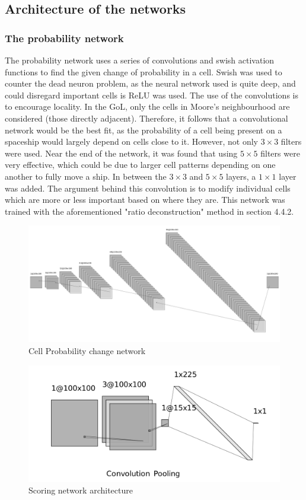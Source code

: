 \documentclass{l4proj}
\begin{document}
\subsection{Architecture of the networks}

\subsubsection{The probability network}

The probability network uses a series of convolutions and swish activation functions to find the given change of probability in a cell. Swish was used to counter the dead neuron problem, as the neural network used is quite deep, and could disregard important cells is ReLU was used. The use of the convolutions is to encourage locality. In the GoL, only the cells in Moore's neighbourhood are considered (those directly adjacent). Therefore, it follows that a convolutional network would be the best fit, as the probability of a cell being present on a spaceship would largely depend on cells close to it. However, not only $3 \times 3$ filters were used. Near the end of the network, it was found that using $5 \times 5$ filters were very effective, which could be due to larger cell patterns depending on one another to fully move a ship. In between the $3 \times 3$ and $5 \times 5$ layers, a $1 \times 1$ layer was added. The argument behind this convolution is to modify individual cells which are more or less important based on where they are. This network was trained with the aforementioned "ratio deconstruction" method in section 4.4.2.

\begin{figure}[h]
\centering
\includegraphics[width=0.8\linewidth]{dissertation/images/diagrams/probability_network_diagram.png}
\caption{Cell Probability change network}
\label{fig:subim1}
\end{figure}
\begin{figure}[h]
\centering
\includegraphics[width=0.8\linewidth]{dissertation/images/diagrams/scoring_network_diagram.png}
\caption{Scoring network architecture}
\label{fig:subim1}
\end{figure}
\end{document}
